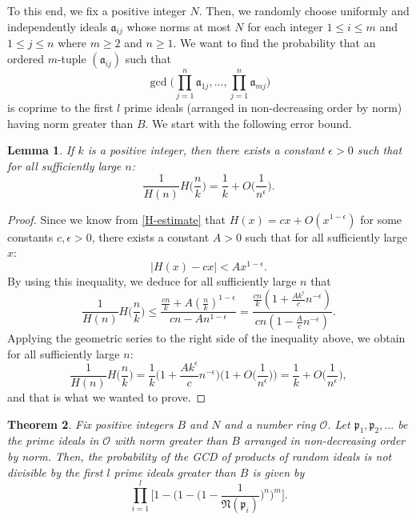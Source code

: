 \documentclass[12pt]{amsart}
\newtheorem{theorem}{Theorem}[subsection]
\newtheorem{lemma}[theorem]{Lemma}
\theoremstyle{definition}
\begin{document}
To this end, we fix a positive integer $N$. Then, we randomly choose uniformly and independently ideals $\mathfrak{a}_{ij}$ whose norms at most $N$ for each integer $1 \leq i \leq m$ and $1 \leq j \leq n$ where $m \geq 2$ and $n \geq 1$. We want to find the probability that an ordered $m$-tuple $(\mathfrak{a}_{ij})$ such that 
$$\gcd\Big(\prod_{j=1}^n \mathfrak{a}_{1j}, ..., \prod_{j=1}^n \mathfrak{a}_{mj}\Big)$$
is coprime to the first $l$ prime ideals (arranged in non-decreasing order by norm) having norm greater than $B$. We start with the following error bound.

\begin{lemma}\label{H-estimate-frac} If $k$ is a positive integer, then there exists a constant $\epsilon > 0$ such that for all sufficiently large $n$:
	$$\frac{1}{H(n)} H\Big(\frac{n}{k}\Big) = \frac{1}{k} + O\Big(\frac{1}{n^{\epsilon}}\Big).$$
\end{lemma}

\begin{proof}
	Since we know from \cref{H-estimate} that $H(x) = cx + O(x^{1-\epsilon})$ for some constants $c, \epsilon > 0$, there exists a constant $A > 0$ such that for all sufficiently large $x$:
	$$|H(x) - cx| < Ax^{1-\epsilon}.$$
	By using this inequality, we deduce for all sufficiently large $n$ that
	$$\frac{1}{H(n)} H\Big(\frac{n}{k}\Big) \leq \frac{\frac{cn}{k} + A(\frac{n}{k})^{1-\epsilon}}{cn - An^{1-\epsilon}} = \frac{\frac{cn}{k} (1 + \frac{Ak^{\epsilon}}{c} n^{-\epsilon})}{cn(1 - \frac{A}{c}n^{-\epsilon})}.$$
	Applying the geometric series to the right side of the inequality above, we obtain for all sufficiently large $n$:
	$$\frac{1}{H(n)} H\Big(\frac{n}{k}\Big) = \frac{1}{k} \Big(1 + \frac{Ak^{\epsilon}}{c} n^{-\epsilon}\Big) \Big(1 + O\Big(\frac{1}{n^{\epsilon}}\Big)\Big) = \frac{1}{k} + O\Big(\frac{1}{n^{\epsilon}}\Big),$$
	and that is what we wanted to prove.
\end{proof}

\begin{theorem}
	Fix positive integers $B$ and $N$ and a number ring $\mathcal{O}$. Let $\mathfrak{p}_1, \mathfrak{p}_2, ...$ be the prime ideals in $\mathcal{O}$ with norm greater than $B$ arranged in non-decreasing order by norm. Then, the probability of the GCD of products of random ideals is not divisible by the first $l$ prime ideals greater than $B$ is given by 
	$$\prod_{i=1}^{l} \Big[1 - \Big(1 - \Big(1-\frac{1}{\mathfrak{N}(\mathfrak{p}_i)}\Big)^n\Big)^m\Big].$$
\end{theorem}
\end{document}
